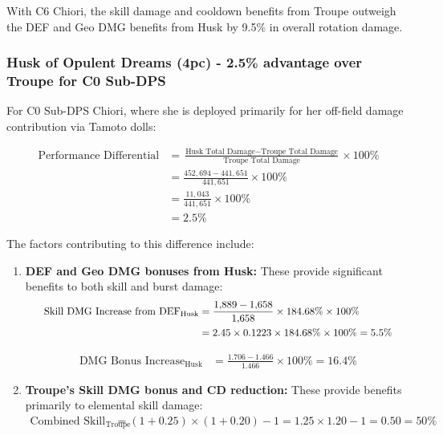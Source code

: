 \documentclass[12pt,a4paper]{article}
\begin{document}
With C6 Chiori, the skill damage and cooldown benefits from Troupe outweigh the DEF and Geo DMG benefits from Husk by 9.5\% in overall rotation damage.

\subsubsection{Husk of Opulent Dreams (4pc) - 2.5\% advantage over Troupe for C0 Sub-DPS}

For C0 Sub-DPS Chiori, where she is deployed primarily for her off-field damage contribution via Tamoto dolls:

\begin{align}
\text{Performance Differential} &= \frac{\text{Husk Total Damage} - \text{Troupe Total Damage}}{\text{Troupe Total Damage}} \times 100\% \\
&= \frac{452,694 - 441,651}{441,651} \times 100\% \\
&= \frac{11,043}{441,651} \times 100\% \\
&= 2.5\%
\end{align}

The factors contributing to this difference include:

\begin{enumerate}
    \item \textbf{DEF and Geo DMG bonuses from Husk:} These provide significant benefits to both skill and burst damage:
\[
\resizebox{.9\textwidth}{!}{$
\begin{aligned}
\text{Skill DMG Increase from DEF}_{\text{Husk}}
  &= \frac{1{,}889-1{,}658}{1{,}658}\times 184.68\%\times 100\%  \\
  &= 2.45 \times 0.1223 \times 184.68\% \times 100\% = 5.5\%
\end{aligned}
$}
\]
    
    \begin{align}
    \text{DMG Bonus Increase}_{\text{Husk}} &= \frac{1.706 - 1.466}{1.466} \times 100\% = 16.4\%
    \end{align}
    
    \item \textbf{Troupe's Skill DMG bonus and CD reduction:} These provide benefits primarily to elemental skill damage:
    \begin{align}
    \text{Combined Skill Benefit}_{\text{Troupe}} &= (1 + 0.25) \times (1 + 0.20) - 1 = 1.25 \times 1.20 - 1 = 0.50 = 50\%
    \end{align}
\end{enumerate}
\end{document}
